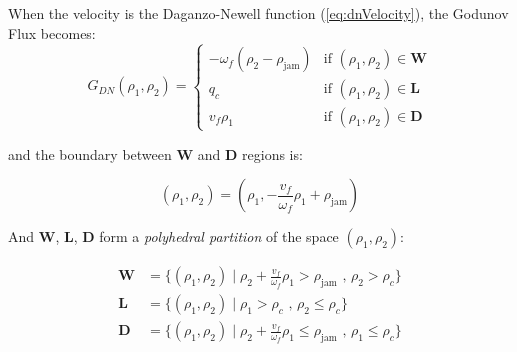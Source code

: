 \noindent When the velocity is the Daganzo-Newell function (\ref{eq:dnVelocity}), the Godunov Flux becomes:
\begin{equation} \label{eq:rhoGodunovFlux3}
G_{DN}(\rho_{1},\rho_{2}) = \begin{cases}
-\omega_{f} \left( \rho_{2} - \rho_{\text{jam}} \right) & \text{if } (\rho_{1},\rho_{2}) \in \textbf{W}\\
q_{c} & \text{if } (\rho_{1},\rho_{2}) \in \textbf{L}\\
v_{f} \rho_{1} & \text{if } (\rho_{1},\rho_{2}) \in \textbf{D}
\end{cases}
\end{equation}

\noindent and the boundary between \textbf{W} and \textbf{D} regions is:

\begin{equation} \label{eq:boundary}
(\rho_{1},\rho_{2})=(\rho_{1},-\frac{v_{f}}{\omega_{f}}\rho_{1}+\rho_{\text{jam}})
\end{equation}

\noindent And \textbf{W}, \textbf{L}, \textbf{D} form a \textit{polyhedral partition} of the space $(\rho_{1},\rho_{2})$:

\begin{equation}
\begin{array}{ll}
\textbf{W} & = \{(\rho_{1},\rho_{2}) \mid \rho_{2} + \frac{v_{f}}{\omega_{f}}\rho_{1} > \rho_{\text{jam}} \text{ ,   } \rho_{2} > \rho_{c}\}\\
\textbf{L} & = \{(\rho_{1},\rho_{2}) \mid \rho_{1} > \rho_{c} \text{ ,   } \rho_{2} \leq \rho_{c}\}\\
\textbf{D} & = \{(\rho_{1},\rho_{2}) \mid \rho_{2} + \frac{v_{f}}{\omega_{f}}\rho_{1} \leq \rho_{\text{jam}} \text{ ,   } \rho_{1} \leq \rho_{c}\}\end{array}
\label{eq:regions2}
\end{equation}